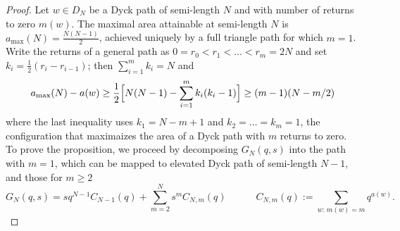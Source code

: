 \documentclass[pdflatex,sn-mathphys-num]{sn-jnl}
\theoremstyle{definition}
\theoremstyle{remark}
\numberwithin{equation}{section}
\begin{document}
\begin{proof}
Let $w\in D_{N}$ be a Dyck path of semi-length $N$ and with number of returns to zero $m(w)$.  The maximal area attainable at semi-length $N$ is
$a_{\max}(N)=\tfrac{N(N-1)}{2}$, achieved uniquely by a full triangle path for which $m=1$.
Write the returns of a general path as $0=r_{0}<r_{1}<\dots<r_{m}=2N$ and set $k_{i}=\tfrac12(r_{i}-r_{i-1})$; then $\sum_{i=1}^{m}k_{i}=N$ and
\begin{equation}
a_{\max}(N)-a(w) \ge \frac12\Bigl[N(N-1)-\sum_{i=1}^{m}k_{i}(k_{i}-1)\Bigr]
\ge 
(m-1) (N - m/2)
\label{eq:area-loss}
\end{equation}
where the last inequality uses $k_{1}=N-m+1$ and $k_{2}=\dots=k_{m}=1$, the configuration that maximaizes the area of a Dyck path with $m$ returns to zero.
To prove the proposition, we proceed by decomposing $G_N(q,s)$ into the path with $m=1$, which can be mapped to elevated Dyck path of semi-length $N-1$,
and those for $m \geq 2$
\begin{equation}
     G_{N}(q,s)=
  s q^{N-1}
  C_{N-1}(q)+ \sum_{m=2}^{N}s^{m} C_{N,m}(q)
  \quad
\qquad
 C_{N,m}(q) := \sum_{w:\,m(w)=m}q^{a(w)}.
 \label{eq:decompose}
\end{equation}


\end{proof}
\end{document}
